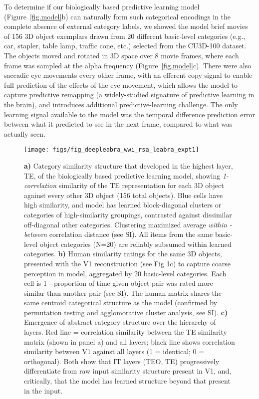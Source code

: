 \documentclass[12pt,twoside]{naturefigs}  %
\newif\myifpdf
\begin{document}
To determine if our biologically based predictive learning model (Figure~\ref{fig.model}b) can naturally form such categorical encodings in the complete absence of external category labels, we showed the model brief movies of 156 3D object exemplars drawn from 20 different basic-level categories (e.g., car, stapler, table lamp, traffic cone, etc.) selected from the CU3D-100 dataset\cite{OReillyWyatteHerdEtAl13}.  The objects moved and rotated in 3D space over 8 movie frames, where each frame was sampled at the alpha frequency (Figure~\ref{fig.model}c).  There were also saccadic eye movements every other frame, with an efferent copy signal to enable full prediction of the effects of the eye movement, which allows the model to capture predictive remapping (a widely-studied signature of predictive learning in the brain)\cite{DuhamelColbyGoldberg92,CavanaghHuntAfrazEtAl10}, and introduces additional predictive-learning challenge.  The only learning signal available to the model was the temporal difference prediction error between what it predicted to see in the next frame, compared to what was actually seen.  

\begin{figure}
  \centering\texttt{[image: figs/fig\_deepleabra\_wwi\_rsa\_leabra\_expt1]}
  \caption{\small \protect{} {\bf a)} Category similarity structure that developed in the highest layer, TE, of the biologically based predictive learning model, showing {\em 1-correlation} similarity of the TE representation for each 3D object against every other 3D object (156 total objects). Blue cells have high similarity, and model has learned block-diagonal clusters or categories of high-similarity groupings, contrasted against dissimilar off-diagonal other categories.  Clustering maximized average {\em within - between} correlation distance (see SI).  All items from the same basic-level object categories (N=20) are reliably subsumed within learned categories. {\bf b)} Human similarity ratings for the same 3D objects, presented with the V1 reconstruction (see Fig 1c) to capture coarse perception in model, aggregated by 20 basic-level categories.  Each cell is 1 - proportion of time given object pair was rated more similar than another pair (see SI).  The human matrix shares the same centroid categorical structure as the model (confirmed by permutation testing and agglomorative cluster analysis, see SI).  {\bf c)} Emergence of abstract category structure over the hierarchy of layers.  Red line = correlation similarity between the TE similarity matrix (shown in panel a) and all layers; black line shows correlation similarity between V1 against all layers (1 = identical; 0 = orthogonal). Both show that IT layers (TEO, TE) progressively differentiate from raw input similarity structure present in V1, and, critically, that the model has learned structure beyond that present in the input.}
  \label{fig.rsa}
\end{figure}
\end{document}
